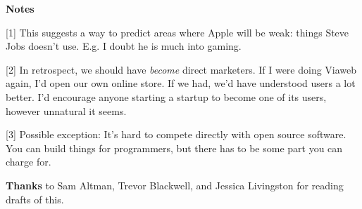\textbf{Notes}

{[}1{]} This suggests a way to predict areas where Apple will be weak:
things Steve Jobs doesn't use. E.g. I doubt he is much into gaming.

{[}2{]} In retrospect, we should have \emph{become} direct marketers. If
I were doing Viaweb again, I'd open our own online store. If we had,
we'd have understood users a lot better. I'd encourage anyone starting a
startup to become one of its users, however unnatural it seems.

{[}3{]} Possible exception: It's hard to compete directly with open
source software. You can build things for programmers, but there has to
be some part you can charge for.

\textbf{Thanks} to Sam Altman, Trevor Blackwell, and Jessica Livingston
for reading drafts of this.
